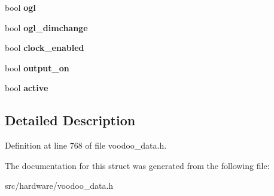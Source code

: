 \begin{DoxyCompactItemize}
\item 
\hypertarget{struct__voodoo__state_a7558084b25ab2048a48f25d57f091d0d}{bool {\bfseries ogl}}\label{struct__voodoo__state_a7558084b25ab2048a48f25d57f091d0d}

\item 
\hypertarget{struct__voodoo__state_ad37253ccf3f4edcd5809454a0e20b6d9}{bool {\bfseries ogl\-\_\-dimchange}}\label{struct__voodoo__state_ad37253ccf3f4edcd5809454a0e20b6d9}

\item 
\hypertarget{struct__voodoo__state_a50d6ce4c83a4db5585b97853bec06339}{bool {\bfseries clock\-\_\-enabled}}\label{struct__voodoo__state_a50d6ce4c83a4db5585b97853bec06339}

\item 
\hypertarget{struct__voodoo__state_a607b8b821a1288b44a6768dc34c04893}{bool {\bfseries output\-\_\-on}}\label{struct__voodoo__state_a607b8b821a1288b44a6768dc34c04893}

\item 
\hypertarget{struct__voodoo__state_a3b211bb03f09c2035bb6537e950b68c2}{bool {\bfseries active}}\label{struct__voodoo__state_a3b211bb03f09c2035bb6537e950b68c2}

\end{DoxyCompactItemize}


\subsection{Detailed Description}


Definition at line 768 of file voodoo\-\_\-data.\-h.



The documentation for this struct was generated from the following file\-:\begin{DoxyCompactItemize}
\item 
src/hardware/voodoo\-\_\-data.\-h\end{DoxyCompactItemize}

